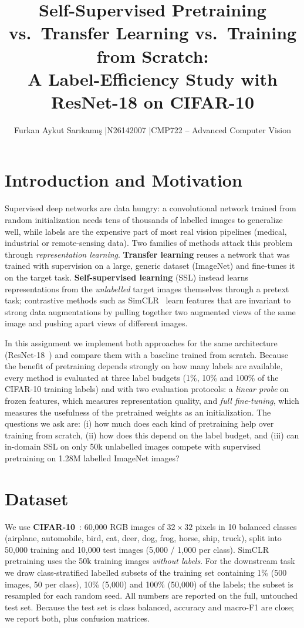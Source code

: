 \documentclass[10pt,a4paper]{article}
\title{\vspace{-1.2cm}Self-Supervised Pretraining vs.\ Transfer Learning vs.\ Training from Scratch:\\
A Label-Efficiency Study with ResNet-18 on CIFAR-10}
\author{Furkan Aykut Sar\i kam\i\c{s} \quad|\quad N26142007 \quad|\quad CMP722 -- Advanced Computer Vision}
\date{}
\begin{document}
\maketitle
\vspace{-1.0cm}

\section{Introduction and Motivation}
Supervised deep networks are data hungry: a convolutional network trained from random
initialization needs tens of thousands of labelled images to generalize well, while labels are
the expensive part of most real vision pipelines (medical, industrial or remote-sensing data).
Two families of methods attack this problem through \emph{representation learning}.
\textbf{Transfer learning} reuses a network that was trained with supervision on a large,
generic dataset (ImageNet) and fine-tunes it on the target task.
\textbf{Self-supervised learning} (SSL) instead learns representations from the
\emph{unlabelled} target images themselves through a pretext task; contrastive methods such
as SimCLR~\cite{simclr} learn features that are invariant to strong data augmentations by
pulling together two augmented views of the same image and pushing apart views of different
images.

In this assignment we implement both approaches for the same architecture (ResNet-18~\cite{resnet})
and compare them with a baseline trained from scratch. Because the benefit of pretraining
depends strongly on how many labels are available, every method is evaluated at three label
budgets (1\%, 10\% and 100\% of the CIFAR-10 training labels) and with two evaluation protocols:
a \emph{linear probe} on frozen features, which measures representation quality, and
\emph{full fine-tuning}, which measures the usefulness of the pretrained weights as an
initialization. The questions we ask are: (i) how much does each kind of pretraining help
over training from scratch, (ii) how does this depend on the label budget, and (iii) can
in-domain SSL on only 50k unlabelled images compete with supervised pretraining on 1.28M
labelled ImageNet images?

\section{Dataset}
We use \textbf{CIFAR-10}~\cite{cifar}: 60{,}000 RGB images of $32\times32$ pixels in 10
balanced classes (airplane, automobile, bird, cat, deer, dog, frog, horse, ship, truck),
split into 50{,}000 training and 10{,}000 test images (5{,}000 / 1{,}000 per class).
SimCLR pretraining uses the 50k training images \emph{without labels}. For the downstream
task we draw class-stratified labelled subsets of the training set containing 1\% (500 images,
50 per class), 10\% (5{,}000) and 100\% (50{,}000) of the labels; the subset is resampled for each
random seed. All numbers are reported on the full, untouched test set. Because the
test set is class balanced, accuracy and macro-F1 are close; we report both, plus confusion
matrices.
\end{document}
